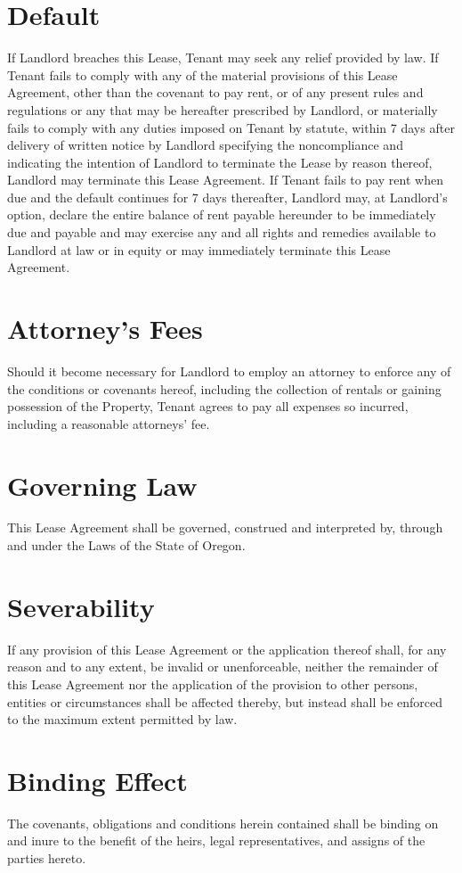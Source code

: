 \documentclass{amsart}
\begin{document}
\section{Default}
If Landlord breaches this Lease, Tenant may seek any relief provided by law. If
Tenant fails to comply with any of the material provisions of this  Lease
Agreement, other than the covenant to pay rent, or of any present rules and
regulations or any that may be hereafter prescribed by Landlord, or materially
fails to comply with any duties imposed on Tenant by statute, within 7 days
after delivery of written notice by Landlord specifying the noncompliance and
indicating the intention of Landlord to terminate the Lease by reason thereof,
Landlord may terminate this Lease Agreement. If Tenant fails to pay rent when
due and the default continues for 7 days thereafter, Landlord may, at Landlord's
option, declare the entire balance of rent payable hereunder to be immediately
due and payable and may exercise any and all rights and remedies available to
Landlord at law or in equity or may immediately terminate this Lease Agreement.
\section{Attorney's Fees}
Should it become necessary for Landlord to employ an attorney to enforce any of
the conditions or covenants hereof, including the collection of rentals or
gaining possession of the Property, Tenant agrees to pay all expenses so
incurred, including a reasonable attorneys' fee.
\section{Governing Law}
This Lease Agreement shall be governed, construed and interpreted by, through
and under the Laws of the State of Oregon.
\section{Severability}
If any provision of this  Lease Agreement or the application thereof shall, for
any reason and to any extent, be invalid or unenforceable, neither the remainder
of this Lease Agreement nor the application of the provision to other persons,
entities or circumstances shall be affected thereby, but instead shall be
enforced to the maximum extent permitted by law.
\section{Binding Effect}
The covenants, obligations and conditions herein contained shall be binding on
and inure to the benefit of the heirs, legal representatives, and assigns of the
parties hereto.
\end{document}
